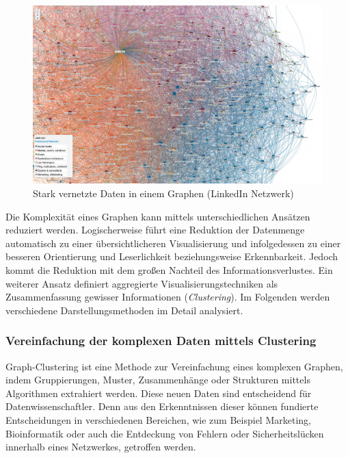 \begin{figure}
    \centering
    \includegraphics[width=1\textwidth]{content/img/Research/Visualisation/big_data_2.png}
    \caption{Stark vernetzte Daten in einem Graphen (LinkedIn Netzwerk) \cite{bigdata2014image}}
    \label{fig:BigData}
\end{figure}
\FloatBarrier

Die Komplexität eines Graphen kann mittels unterschiedlichen Ansätzen reduziert werden. Logischerweise führt eine Reduktion der Datenmenge automatisch zu einer übersichtlicheren Visualisierung und infolgedessen zu einer besseren Orientierung und Leserlichkeit beziehungsweise Erkennbarkeit. Jedoch kommt die Reduktion mit dem großen Nachteil des Informationsverlustes. Ein weiterer Ansatz definiert aggregierte Visualisierungstechniken als Zusammenfassung gewisser Informationen (\emph{Clustering}). Im Folgenden werden verschiedene Darstellungsmethoden im Detail analysiert. \cite{heins2017herausforderungen}

\subsubsection{Vereinfachung der komplexen Daten mittels Clustering}

Graph-Clustering ist eine Methode zur Vereinfachung eines komplexen Graphen, indem Gruppierungen, Muster, Zusammenhänge oder Strukturen mittels Algorithmen extrahiert werden. Diese neuen Daten sind entscheidend für Datenwissenschaftler. Denn aus den Erkenntnissen dieser können fundierte Entscheidungen in verschiedenen Bereichen, wie zum Beispiel Marketing, Bioinformatik oder auch die Entdeckung von Fehlern oder Sicherheitslücken innerhalb eines Netzwerkes, getroffen werden. \cite{pusic2023clustering}

